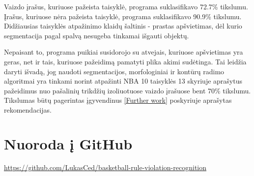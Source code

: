 \documentclass{VUMIFPSkursinis}
\begin{document}
 Vaizdo įrašus, kuriuose pažeista taisyklė, programa suklasifikavo 72.7\% tikslumu. Įrašus, kuriuose nėra pažeista taisyklė, programa suklasifikavo 90.9\% tikslumu. Didžiausias taisyklės atpažinimo klaidų šaltinis - prastas apšvietimas, dėl kurio segmentacija pagal spalvą nesugeba tinkamai išgauti objektų.
 
Nepaisant to, programa puikiai susidorojo su atvejais, kuriuose apšvietimas yra geras, net ir tais, kuriuose pažeidimą pamatyti plika akimi sudėtinga. Tai leidžia daryti išvadą, jog naudoti segmentacijos, morfologiniai ir kontūrų radimo algoritmai yra tinkami norint atpažinti NBA 10 taisyklės 13 skyriuje aprašytus pažeidimus nuo pašalinių trikdžių izoliuotuose vaizdo įrašuose bent 70\% tikslumu. Tikslumas būtų pagerintas įgyvendinus \ref{Further work} poskyriuje aprašytas rekomendacijas.


\printbibliography[heading=bibintoc]  %

\appendix  %
\section{Nuoroda į GitHub}
\url{https://github.com/LukasCed/basketball-rule-violation-recognition}
\end{document}
